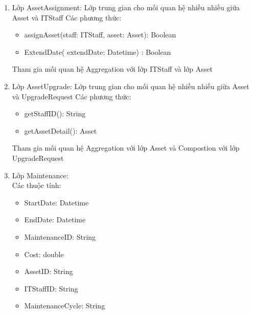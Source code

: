 \begin{enumerate}
\begin{itemize}[label=--]
        \item AssetID: String
        \item Name: String
    \end{itemize}
    Phương thức:
    \begin{itemize}[label=--]
        \item GetAllAssets(): List<Asset>
        \item  CreateAssetAsync(asset: AssetDto): Asset
        \item UpdateAsset(Id: string, asset: AssetDto): Asset
        \item DeleteAsset(Id: string): Bool  
    \end{itemize}
    Mối quan hệ tham gia:
    \begin{itemize}[label=--]
        \item Aggregation với lớp AssetUpgrade, AssetAssignment
        \item Compostion với lớp Error
        \item Association với lớp Maintenance, Disposal, Implementation, Utilization, DisposalRequest, Procurement
    \end{itemize}
    \item Lớp AssetAssignment: Lớp trung gian cho mối quan hệ nhiều nhiều giữa Asset và ITStaff
    Các phương thức:
    \begin{itemize}[label=--]
        \item assignAsset(staff: ITStaff, asset: Asset): Boolean
        \item ExtendDate( extendDate: Datetime) : Boolean 
    \end{itemize}
    Tham gia mối quan hệ Aggregation với lớp ITStaff và lớp Asset
    \item Lớp AssetUpgrade: Lớp trung gian cho mối quan hệ nhiều nhiều giữa Asset và UpgradeRequest
    Các phương thức:
    \begin{itemize}[label=--]
        \item getStaffID(): String
        \item getAssetDetail(): Asset 
    \end{itemize}
    Tham gia mối quan hệ Aggregation với  lớp Asset và Compostion với lớp UpgradeRequest
    \item Lớp Maintenance:\\
    Các thuộc tính:
    \begin{itemize}[label=--]
        \item StartDate: Datetime
        \item EndDate: Datetime
        \item MaintenanceID: String
        \item Cost: double
        \item AssetID: String
        \item ITStaffID: String
        \item MaintenanceCycle: String
        

\end{itemize}
\end{enumerate}

